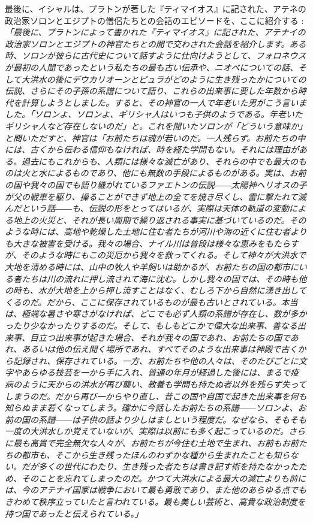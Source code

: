 \documentclass[10pt,twocolumn,letterpaper]{article}
\begin{document}
最後に、イシャルは、プラトンが著した『ティマイオス』に記された、アテネの政治家ソロンとエジプトの僧侶たちとの会話のエピソードを、ここに紹介する \cite{140}: \textit{「最後に、プラトンによって書かれた『ティマイオス』に記された、アテナイの政治家ソロンとエジプトの神官たちとの間で交わされた会話を紹介します。ある時、ソロンが彼らに古代史について話すように仕向けようとして、フォロネウスが最初の人間であったという私たちの最も古い伝承や、ニオベについての話、そして大洪水の後にデウカリオーンとピュラがどのように生き残ったかについての伝説、さらにその子孫の系譜について語り、これらの出来事に要した年数から時代を計算しようとしました。すると、その神官の一人で年老いた男がこう言いました。「ソロンよ、ソロンよ、ギリシャ人はいつも子供のようである。年老いたギリシャ人など存在しないのだ」と。これを聞いたソロンが「どういう意味か」と問いただすと、神官は「お前たちは魂が若いのだ。一人残らず。お前たちの中には、古くから伝わる信仰もなければ、時を経た学問もない。それには理由がある。過去にもこれからも、人類には様々な滅亡があり、それらの中でも最大のものは火と水によるものであり、他にも無数の手段によるものがある。実は、お前の国や我々の国でも語り継がれているファエトンの伝説――太陽神ヘリオスの子が父の戦車を駆り、操ることができず地上の全てを焼き尽くし、雷に撃たれて滅んだという話――も、伝説の形をとってはいるが、実際は天体の軌道の変動による地上の火災と、それが長い周期で繰り返される事実に基づいているのだ。そのような時には、高地や乾燥した土地に住む者たちが河川や海の近くに住む者よりも大きな被害を受ける。我々の場合、ナイル川は普段は様々な恵みをもたらすが、そのような時にもこの災厄から我々を救ってくれる。そして神々が大洪水で大地を清める時には、山中の牧人や羊飼いは助かるが、お前たちの国の都市にいる者たちは川の流れに押し流されて海に沈む。しかし我々の国では、その時も他の時も、水が大地を上から押し流すことはなく、むしろ下から自然に湧き出してくるのだ。だから、ここに保存されているものが最も古いとされている。本当は、極端な暑さや寒さがなければ、どこでも必ず人類の系譜が存在し、数が多かったり少なかったりするのだ。そして、もしもどこかで偉大な出来事、善なる出来事、目立つ出来事が起きた場合、それが我々の国であれ、お前たちの国であれ、あるいは他の伝え聞く場所であれ、すべてそのような出来事は神殿で古くから記録され、保存されている。一方、お前たちや他の人々は、そのたびごとに文字やあらゆる技芸を一から手に入れ、普通の年月が経過した後には、まるで疫病のように天からの洪水が再び襲い、教養も学問も持たぬ者以外を残らず失ってしまうのだ。だから再び一からやり直し、昔この国や自国で起きた出来事を何も知らぬまま若くなってしまう。確かに今話したお前たちの系譜――ソロンよ、お前の国の系譜――は子供の話より少しはましという程度だ。なぜなら、そもそも一度の大洪水しか覚えていないが、実際は以前にも多く起こっているのだ。さらに最も高貴で完全無欠な人々が、お前たちが今住む土地で生まれ、お前もお前たちの都市も、そこから生き残ったほんのわずかな種から生まれたことも知らない。だが多くの世代にわたり、生き残った者たちは書き記す術を持たなかったため、そのことを忘れてしまったのだ。かつて大洪水による最大の滅亡よりも前には、今のアテナイ国家は戦争において最も勇敢であり、また他のあらゆる点でもきわめて秩序立っていたと言われている。最も美しい芸術と、高貴な政治制度を持つ国であったと伝えられている。」}
\end{document}
